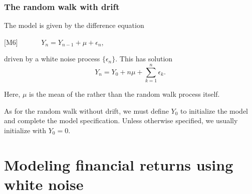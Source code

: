 \begin{frame}[fragile]
\frametitle{The random walk with drift}
\bi
\item The  model is given by the difference equation

\vspace{2mm}

[M6] $\quad\quad\quad Y_n = Y_{n-1} + \mu + \epsilon_n$,

\vspace{2mm}

driven by a white noise process $\{\epsilon_n\}$. This has solution
$$ Y_n = Y_0 + n\mu + \sum_{k=1}^n\epsilon_k.$$

\item Here, $\mu$ is the mean of the  rather than the random walk process itself.

\item As for the random walk without drift, we must define $Y_0$ to initialize the model and complete the model specification. Unless otherwise specified, we usually initialize with $Y_0=0$.

\ei

\end{frame} 

\section{Modeling financial returns using white noise}

